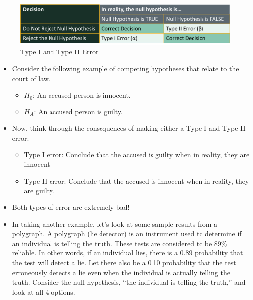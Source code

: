 \documentclass[
  letterpaper,
  DIV=11,
  numbers=noendperiod]{scrreprt}
\providecommand{\tightlist}{%
  \setlength{\itemsep}{0pt}\setlength{\parskip}{0pt}}\usepackage{longtable,booktabs,array}
\begin{document}
\begin{figure}[H]

{\centering \includegraphics{Pictures/Ch7/Type1_2Error.png}

}

\caption{Type I and Type II Error}

\end{figure}%

\begin{itemize}
\item
  Consider the following example of competing hypotheses that relate to
  the court of law.

  \begin{itemize}
  \tightlist
  \item
    \(H_0\): An accused person is innocent.
  \item
    \(H_A\): An accused person is guilty.
  \end{itemize}
\item
  Now, think through the consequences of making either a Type I and Type
  II error:

  \begin{itemize}
  \tightlist
  \item
    Type I error: Conclude that the accused is guilty when in reality,
    they are innocent.
  \item
    Type II error: Conclude that the accused is innocent when in
    reality, they are guilty.
  \end{itemize}
\item
  Both types of error are extremely bad!
\item
  In taking another example, let's look at some sample results from a
  polygraph. A polygraph (lie detector) is an instrument used to
  determine if an individual is telling the truth. These tests are
  considered to be 89\% reliable. In other words, if an individual lies,
  there is a 0.89 probability that the test will detect a lie. Let there
  also be a 0.10 probability that the test erroneously detects a lie
  even when the individual is actually telling the truth. Consider the
  null hypothesis, ``the individual is telling the truth,'' and look at
  all 4 options.


\end{itemize}
\end{document}
